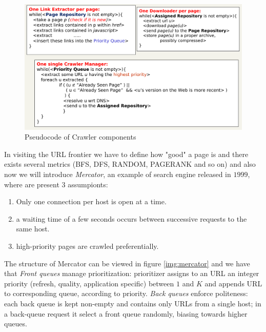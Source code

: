 \begin{figure}
    \caption{Pseudocode of Crawler components}
    \label{img:crawlerALgorithm}
    \includegraphics[width=\textwidth]{Images/crawlerPseudocode}
\end{figure}
In visiting the URL frontier we have to define how "good" a page is and there exists several metrics (BFS, DFS, RANDOM, PAGERANK and so on) and also now
we will introduce \emph{Mercator}, an example of search engine released in $1999$, where are present $3$ assumpionts:
\begin{enumerate}
    \item Only one connection per host is open at a time.
    \item a waiting time of a few seconds occurs between successive requests to the same host.
    \item high-priority pages are crawled preferentially.
\end{enumerate}
The structure of Mercator can be viewed in figure \ref{img:mercator} and we have that \emph{Front queues} manage prioritization: prioritizer assigns to an URL an integer priority (refresh,
quality, application specific) between $1$ and $K$ and appends URL to corresponding queue, according to priority.\newline
\emph{Back queues} enforce politeness: each back queue is kept non-empty and contains only URLs from a single host; in a back-queue request it select a front queue randomly, biasing towards higher queues.

